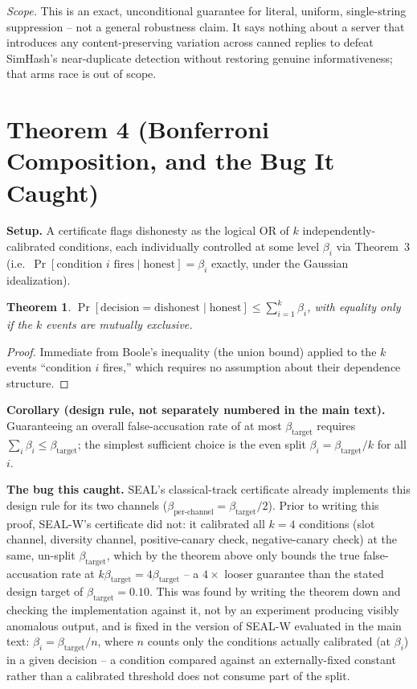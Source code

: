 \documentclass[10pt,journal,compsoc]{IEEEtran}
\newtheorem{theorem}{Theorem}
\begin{document}
\noindent \emph{Scope.} This is an exact, unconditional guarantee for literal, uniform, single-string suppression -- not a general robustness claim. It says nothing about a server that introduces any content-preserving variation across canned replies to defeat SimHash's near-duplicate detection without restoring genuine informativeness; that arms race is out of scope.

\section*{Theorem 4 (Bonferroni Composition, and the Bug It Caught)}

\textbf{Setup.} A certificate flags dishonesty as the logical OR of $k$ independently-calibrated conditions, each individually controlled at some level $\beta_i$ via Theorem~3 (i.e.\ $\Pr[\text{condition }i\text{ fires}\mid\text{honest}]=\beta_i$ exactly, under the Gaussian idealization).

\begin{theorem}
$\Pr[\text{decision}=\text{dishonest}\mid\text{honest}] \le \sum_{i=1}^{k}\beta_i$, with equality only if the $k$ events are mutually exclusive.
\end{theorem}

\begin{proof}
Immediate from Boole's inequality (the union bound) applied to the $k$ events ``condition $i$ fires,'' which requires no assumption about their dependence structure.
\end{proof}

\noindent \textbf{Corollary (design rule, not separately numbered in the main text).} Guaranteeing an overall false-accusation rate of at most $\beta_{\text{target}}$ requires $\sum_i\beta_i \le \beta_{\text{target}}$; the simplest sufficient choice is the even split $\beta_i=\beta_{\text{target}}/k$ for all $i$.

\noindent \textbf{The bug this caught.} SEAL's classical-track certificate already implements this design rule for its two channels ($\beta_{\text{per-channel}}=\beta_{\text{target}}/2$). Prior to writing this proof, SEAL-W's certificate did not: it calibrated all $k{=}4$ conditions (slot channel, diversity channel, positive-canary check, negative-canary check) at the same, un-split $\beta_{\text{target}}$, which by the theorem above only bounds the true false-accusation rate at $k\beta_{\text{target}} = 4\beta_{\text{target}}$ -- a $4\times$ looser guarantee than the stated design target of $\beta_{\text{target}}=0.10$. This was found by writing the theorem down and checking the implementation against it, not by an experiment producing visibly anomalous output, and is fixed in the version of SEAL-W evaluated in the main text: $\beta_i = \beta_{\text{target}}/n$, where $n$ counts only the conditions actually calibrated (at $\beta_i$) in a given decision -- a condition compared against an externally-fixed constant rather than a calibrated threshold does not consume part of the split.
\end{document}
